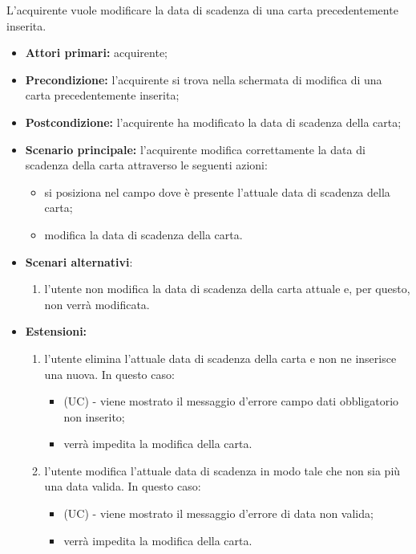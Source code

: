 L'acquirente vuole modificare la data di scadenza di una carta precedentemente inserita.
\begin{itemize}
    \item \textbf{Attori primari:} acquirente;
    \item \textbf{Precondizione:} l'acquirente si trova nella schermata di modifica di una carta precedentemente inserita;
    \item \textbf{Postcondizione:} l'acquirente ha modificato la data di scadenza della carta;
    \item \textbf{Scenario principale:} l'acquirente modifica correttamente la data di scadenza della carta attraverso le seguenti azioni:
    \begin{itemize}
        \item si posiziona nel campo dove è presente l'attuale data di scadenza della carta;
        \item modifica la data di scadenza della carta.
    \end{itemize}
    \item \textbf{Scenari alternativi}:
    \begin{enumerate}[label=\lett]
        \item l'utente non modifica la data di scadenza della carta attuale e, per questo, non verrà modificata.
    \end{enumerate}
    \item \textbf{Estensioni:}
    \begin{enumerate}[label=\lett]
        \item l'utente elimina l'attuale data di scadenza della carta e non ne inserisce una nuova. In questo caso:
        \begin{itemize}
            \item (UC) - viene mostrato il messaggio d'errore campo dati obbligatorio non inserito;
            \item verrà impedita la modifica della carta.
        \end{itemize}
        \item l'utente modifica l'attuale data di scadenza in modo tale che non sia più una data valida. In questo caso:
        \begin{itemize}
            \item (UC) - viene mostrato il messaggio d'errore di data non valida;
            \item verrà impedita la modifica della carta.
        \end{itemize}
    \end{enumerate}
\end{itemize}

